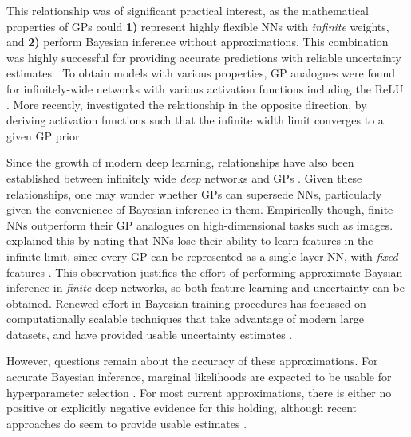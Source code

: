 This relationship was of significant practical interest, as the mathematical properties of GPs could \textbf{1)} represent highly flexible NNs with \emph{infinite} weights, and \textbf{2)} perform Bayesian inference without approximations.
This combination was highly successful for providing accurate predictions with reliable uncertainty estimates \citep{williams1996gaussian,rasmussen1997evaluation}.
To obtain models with various properties, GP analogues were found for infinitely-wide networks with various activation functions \citep{williams1998computation,mackay1998introgp} including the ReLU \citep{cho2009kernel}. More recently, \citet{Meronen2020} investigated the relationship in the opposite direction, by deriving activation functions such that the infinite width limit converges to a given GP prior.

Since the growth of modern deep learning, relationships have also been established between infinitely wide \emph{deep} networks and GPs \citep{matthews2018gaussian,lee2018dnnlimit,yang2019wide}. Given these relationships, one may wonder whether GPs can supersede NNs, particularly given the convenience of Bayesian inference in them. Empirically though, finite NNs outperform their GP analogues \citep{lee2018dnnlimit,garriga2018deep,novak2018bayesian} on high-dimensional tasks such as images. \citet{mackay1998introgp} explained this by noting that NNs lose their ability to learn features in the infinite limit, since every GP can be represented as a single-layer NN, with \emph{fixed} features \citep{mercer1909,rasmussen2006weightfunc}.
This observation justifies the effort of performing approximate Baysian inference in \emph{finite} deep networks, so both feature learning and uncertainty can be obtained. Renewed effort in Bayesian training procedures has focussed on computationally scalable techniques that take advantage of modern large datasets, and have provided usable uncertainty estimates \citep[e.g.,][]{Kingma2015local,blundell2015,Gal2016dropout,louizos2016}.

However, questions remain about the accuracy of these approximations. %
For accurate Bayesian inference, marginal likelihoods are expected to be usable for hyperparameter selection \citep{mackay1992bmc,mackay2003information}. For most current approximations, there is either no positive or explicitly negative \citep{blundell2015} evidence for this holding, although recent approaches do seem to provide usable estimates \citep{ober2020global,immer2021marglik}.

